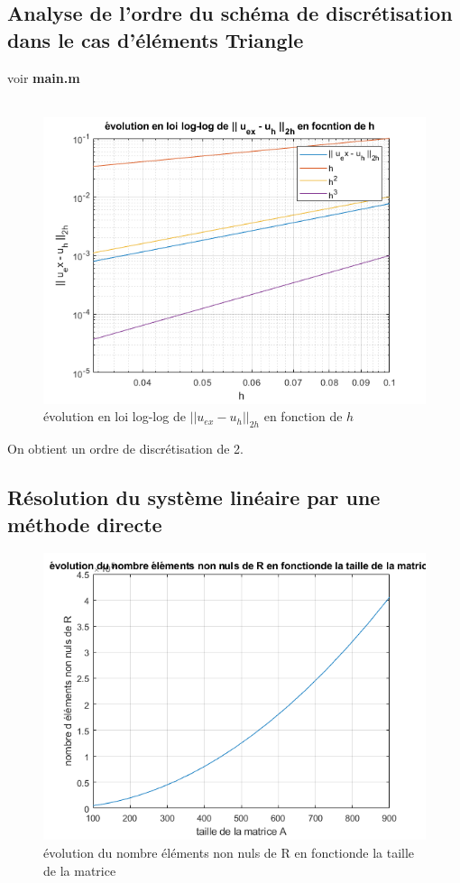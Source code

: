 \documentclass{article}
\begin{document}
\subsection{Analyse de l'ordre du schéma de discrétisation dans le cas d'éléments Triangle}

voir \textbf{main.m} \\ \\ 

\begin{figure}[H]
\centering
\includegraphics[width=12cm]{loglog.png}
\caption{évolution en loi log-log de $|| u_{ex} - u_h ||_{2h}$ en fonction de $h$}
\end{figure}
On obtient un ordre de discrétisation de 2.


\subsection{Résolution du système linéaire par une méthode directe}
\begin{figure}[H]
\centering
\includegraphics[width=12cm]{nonzero.png}
\caption{évolution du nombre éléments non nuls de R en fonctionde la taille de la matrice}
\end{figure}
\end{document}
